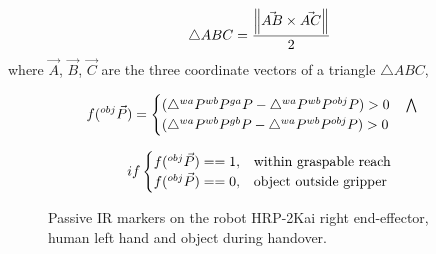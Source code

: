 \documentclass[a4paper, 12pt, oneside]{Thesis}  %
\begin{document}

\begin{equation}\label{area general}
        \triangle{ABC} = \frac{\norm{ \vec{AB} \times \vec{AC} }} {2} \\
\end{equation}
where $\vec{A}$, $\vec{B}$, $\vec{C}$ are the three coordinate vectors of a triangle $\triangle{ABC}$,


\begin{equation}\label{area}
    \centering
    f({}^{obj}\vec{P}) = 
    \begin{cases}
     (\triangle{{}^{wa}P {}^{wb}P {}^{ga}P} - \triangle{{}^{wa}P {}^{wb}P {}^{obj}P}) > 0 \quad \bigwedge \\
     (\triangle{{}^{wa}P {}^{wb}P {}^{gb}P} - \triangle{{}^{wa}P {}^{wb}P {}^{obj}P}) > 0
   \end{cases}         
\end{equation}

\begin{equation}\label{area bool}
    \centering
    if
    \begin{cases}
     f({}^{obj}\vec{P})==1, & \text{within graspable reach}  \\
     f({}^{obj}\vec{P})==0, & \text{object outside gripper}
   \end{cases}         
\end{equation}





\begin{figure}[ht]
	\caption{Passive IR markers on the robot HRP-2Kai right end-effector, human left hand and object during handover.}
	\label{fig:markerEf2}
\end{figure} 
\end{document}
